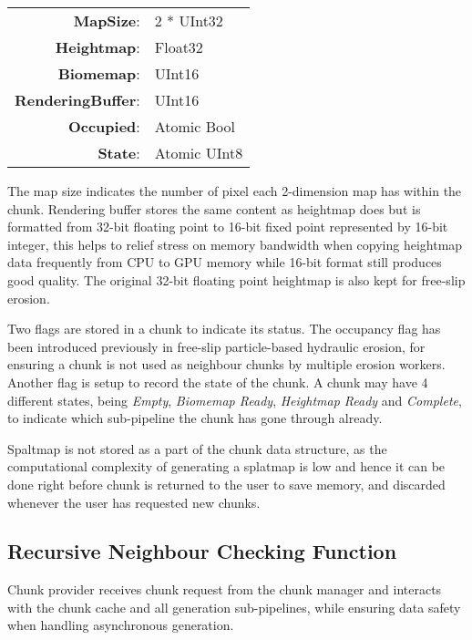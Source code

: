 \documentclass[oneside, a4paper]{report}
\begin{document}
    \begin{center}
        \begin{tabular}{rl}
            \textbf{MapSize}: & 2 * UInt32 \\
            \textbf{Heightmap}: & Float32 \\
            \textbf{Biomemap}: & UInt16 \\
            \textbf{RenderingBuffer}: & UInt16 \\
            \textbf{Occupied}: & Atomic Bool \\
            \textbf{State}: & Atomic UInt8
        \end{tabular}
    \end{center}

    The map size indicates the number of pixel each 2-dimension map has within the chunk. Rendering buffer stores the same content as heightmap does but is formatted from 32-bit floating point to 16-bit fixed point represented by 16-bit integer, this helps to relief stress on memory bandwidth when copying heightmap data frequently from CPU to GPU memory while 16-bit format still produces good quality. The original 32-bit floating point heightmap is also kept for free-slip erosion.

    Two flags are stored in a chunk to indicate its status. The occupancy flag has been introduced previously in free-slip particle-based hydraulic erosion, for ensuring a chunk is not used as neighbour chunks by multiple erosion workers. Another flag is setup to record the state of the chunk. A chunk may have 4 different states, being \textit{Empty}, \textit{Biomemap Ready}, \textit{Heightmap Ready} and \textit{Complete}, to indicate which sub-pipeline the chunk has gone through already.

    Spaltmap is not stored as a part of the chunk data structure, as the computational complexity of generating a splatmap is low and hence it can be done right before chunk is returned to the user to save memory, and discarded whenever the user has requested new chunks.

    \subsection{Recursive Neighbour Checking Function}

    Chunk provider receives chunk request from the chunk manager and interacts with the chunk cache and all generation sub-pipelines, while ensuring data safety when handling asynchronous generation.
\end{document}
